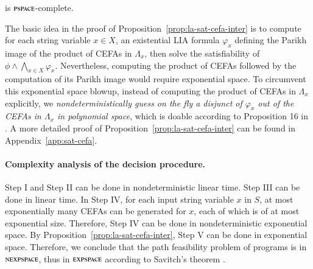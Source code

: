 \begin{proposition}\label{prop:la-sat-cefa-inter}
{\lasat} is $\textsc{pspace}$-complete.
\end{proposition}

The basic idea in the proof of Proposition~\ref{prop:la-sat-cefa-inter} is to compute for each string variable $x \in X$, an existential LIA formula $\varphi_x$ defining the Parikh image of the product of CEFAs in $\Lambda_x$, then solve the satisfiability of $\phi \wedge \bigwedge_{x \in X} \varphi_x$. Nevertheless, computing the product of CEFAs followed by the computation of its Parikh image would require exponential space. To circumvent this exponential space blowup, instead of computing the product of CEFAs in $\Lambda_x$ explicitly,  we \emph{nondeterministically guess on the fly a disjunct of $\varphi_x$ out of the CEFAs in $\Lambda_x$ in polynomial space}, which is doable according to Proposition 16 in \cite{LB16}. A more detailed  proof of Proposition~\ref{prop:la-sat-cefa-inter} can be found in Appendix~\ref{app:sat-cefa}. 



\paragraph*{Complexity analysis of the decision procedure.} Step I and Step II can be done in nondeterministic linear time. Step III can be done in linear time. %
In Step IV, for each input string variable $x$ in $S$, at most exponentially many CEFAs can be generated for $x$, each of which is of at most exponential size. Therefore, Step IV can be done in nondeterministic exponential space. By Proposition~\ref{prop:la-sat-cefa-inter}, Step V can be done in exponential space. Therefore, we conclude that the path feasibility problem of {\slint} programs is in $\textsc{nexpspace}$, thus in $\textsc{expspace}$ according to Savitch's theorem \cite{complexity-book}. 


